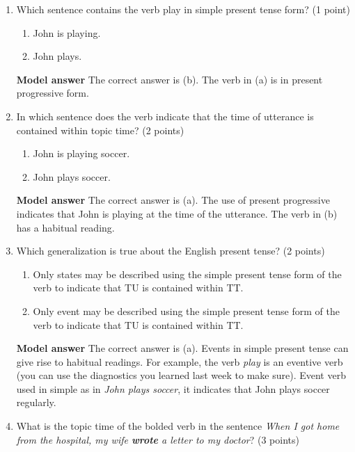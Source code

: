 \documentclass[a4,11pt]{article}
\newcommand{\6}{\mbox{$[\hspace*{-.6mm}[$}}
\newcommand{\9}{\mbox{$]\hspace*{-.6mm}]$}}
\begin{document}
\begin{enumerate}[leftmargin = 12pt]
{\bf Model answer} The correct answers as past tense (a), present tense (b) and future tense (c).


\item Which sentence contains the verb play in simple present tense form? (1 point)

\begin{enumerate}[noitemsep]
\item John is playing.
\item John plays.
\end{enumerate}

{\bf Model answer} The correct answer is (b). The verb in (a) is in present progressive form.


\item In which sentence does the verb indicate that the time of utterance is contained within topic time? (2 points)
\begin{enumerate}[noitemsep]
\item John is playing soccer.
\item John plays soccer.
\end{enumerate}

{\bf Model answer} The correct answer is (a). The use of present progressive indicates that John is playing at the time of the utterance. The verb in (b) has a habitual reading.

\item Which generalization is true about the English present tense? (2 points)

\begin{enumerate}[noitemsep]
\item Only states may be described using the simple present tense form of the verb to indicate that TU is contained within TT.
\item Only event may be described using the simple present tense form of the verb to indicate that TU is contained within TT.\end{enumerate}

{\bf Model answer} The correct answer is (a). Events in simple present tense can give rise to habitual readings. For example, the verb \textit{play} is an eventive verb (you can use the diagnostics you learned last week to make sure). Event verb used in simple as in \textit{John plays soccer}, it indicates that John plays soccer regularly.


\item What is the topic time of the bolded verb in the sentence \textit{When I got home from the hospital, my wife {\bf wrote} a letter to my doctor}? (3 points)


\end{enumerate}
\end{document}
